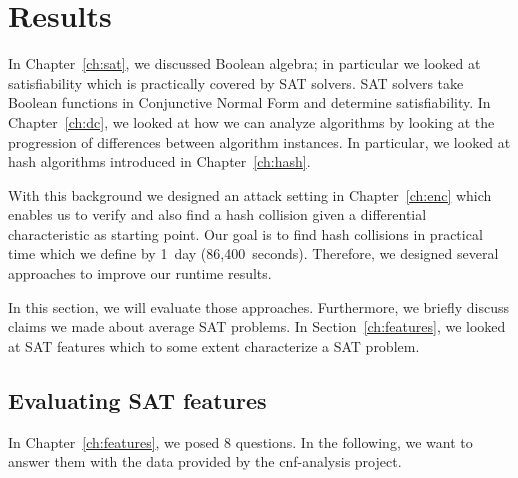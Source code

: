 \renewcommand*\chappic{img/megosat.pdf}
\renewcommand*\chapquote{}
\renewcommand*\chapquotesrc{}
\chapter{Results}
\label{ch:results}
%
In Chapter~\ref{ch:sat}, we discussed Boolean algebra; in particular we looked at
satisfiability which is practically covered by SAT solvers. SAT solvers take
Boolean functions in Conjunctive Normal Form and determine satisfiability.
In Chapter~\ref{ch:dc}, we looked at how we can analyze algorithms by looking
at the progression of differences between algorithm instances. In particular,
we looked at hash algorithms introduced in Chapter~\ref{ch:hash}.

With this background we designed an attack setting in Chapter~\ref{ch:enc}
which enables us to verify and also find a hash collision given a differential
characteristic as starting point. Our goal is to find hash collisions
in practical time which we define by 1~day (86,400~seconds).
Therefore, we designed several approaches to improve our runtime results.

In this section, we will evaluate those approaches. Furthermore, we briefly
discuss claims we made about average SAT problems. In Section~\ref{ch:features},
we looked at SAT features which to some extent characterize a SAT problem.

\section{Evaluating SAT features}
\label{sec:results-features}
%
In Chapter~\ref{ch:features}, we posed 8 questions.
In the following, we want to answer them with the data
provided by the cnf-analysis project.

